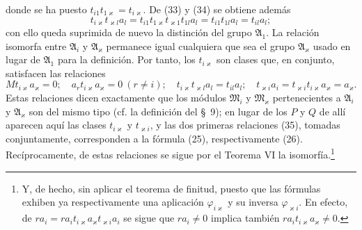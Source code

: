 donde se ha puesto $t_{i1}t_{1\varkappa}=t_{i\varkappa}$. De (33) y (34) se obtiene además
\[
 t_{i\varkappa}t_{\varkappa l}a_l=t_{i1}t_{1\varkappa}t_{\varkappa1}t_{1l}a_l
 =t_{i1}t_{1l}a_l=t_{il}a_l;
\]
con ello queda suprimida de nuevo la distinción del grupo $\mathfrak A_1$. La relación isomorfa entre $\mathfrak A_i$ y $\mathfrak A_\varkappa$ permanece igual cualquiera que sea el grupo $\mathfrak A_\varkappa$ usado en lugar de $\mathfrak A_1$ para la definición. Por tanto, los $t_{i\varkappa}$ son clases que, en conjunto, satisfacen las relaciones
\begin{equation}
 Mt_{i\varkappa}a_\varkappa=0;
 \quad a_rt_{i\varkappa}a_\varkappa=0\ (r\ne i);
 \quad t_{i\varkappa}t_{\varkappa l}a_l=t_{il}a_l;
 \quad t_{\varkappa i}a_i=t_{\varkappa i}t_{i\varkappa}a_\varkappa=a_\varkappa.
\tag{35}
\end{equation}
Estas relaciones dicen exactamente que los módulos $\mathfrak M_i$ y $\mathfrak M_\varkappa$ pertenecientes a $\mathfrak A_i$ y $\mathfrak A_\varkappa$ son del mismo tipo (cf. la definición del \S~9); en lugar de los $P$ y $Q$ de allí aparecen aquí las clases $t_{i\varkappa}$ y $t_{\varkappa i}$, y las dos primeras relaciones (35), tomadas conjuntamente, corresponden a la fórmula (25), respectivamente (26). Recíprocamente, de estas relaciones se sigue por el Teorema VI la isomorfía.\footnote{Y, de hecho, sin aplicar el teorema de finitud, puesto que las fórmulas exhiben ya respectivamente una aplicación $\varphi_{i\varkappa}$ y su inversa $\varphi_{\varkappa i}$. En efecto, de $ra_i=ra_it_{i\varkappa}a_\varkappa t_{\varkappa i}a_i$ se sigue que $ra_i\ne0$ implica también $ra_it_{i\varkappa}a_\varkappa\ne0$.}

